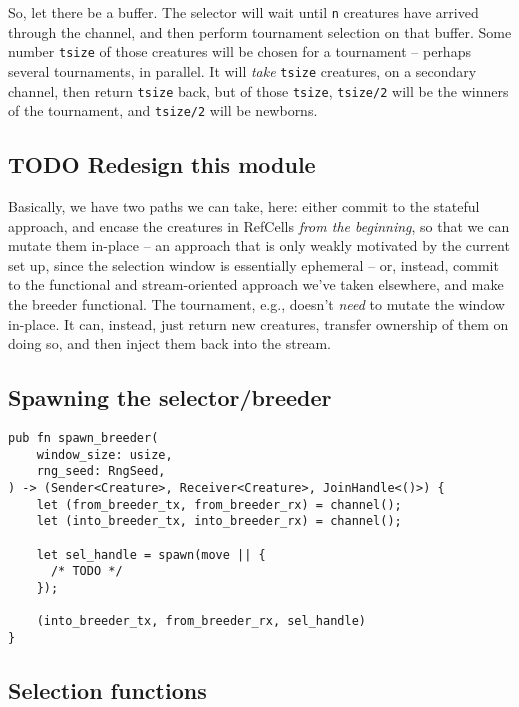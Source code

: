 \documentclass[11pt]{article}
\begin{document}
So, let there be a buffer. The selector will wait until \texttt{n} creatures have
arrived through the channel, and then perform tournament selection on that
buffer. Some number \texttt{tsize} of those creatures will be chosen for a tournament
-- perhaps several tournaments, in parallel. It will \emph{take} \texttt{tsize} creatures, 
on a secondary channel, then return \texttt{tsize} back, but of those \texttt{tsize}, \texttt{tsize/2}
will be the winners of the tournament, and \texttt{tsize/2} will be newborns.


\subsection{{\bfseries\sffamily TODO} Redesign this module}
\label{sec:org32222a4}

Basically, we have two paths we can take, here: either commit to the stateful approach, and
encase the creatures in RefCells \emph{from the beginning}, so that we can mutate them in-place
-- an approach that is only weakly motivated by the current set up, since the selection window
is essentially ephemeral -- or, instead, commit to the functional and stream-oriented approach
we've taken elsewhere, and make the breeder functional. The tournament, e.g., doesn't \emph{need} to
mutate the window in-place. It can, instead, just return new creatures, transfer ownership of 
them on doing so, and then inject them back into the stream. 


\subsection{Spawning the selector/breeder}
\label{sec:orgf5035d6}

\lstset{language=rust,label=org5feeca3,caption= ,captionpos=b,numbers=none}
\begin{lstlisting}
pub fn spawn_breeder(
    window_size: usize,
    rng_seed: RngSeed,
) -> (Sender<Creature>, Receiver<Creature>, JoinHandle<()>) {
    let (from_breeder_tx, from_breeder_rx) = channel();
    let (into_breeder_tx, into_breeder_rx) = channel();

    let sel_handle = spawn(move || {
      /* TODO */
    });

    (into_breeder_tx, from_breeder_rx, sel_handle)
}
\end{lstlisting}

\subsection{Selection functions}
\label{sec:orgcef4a86}
\end{document}
